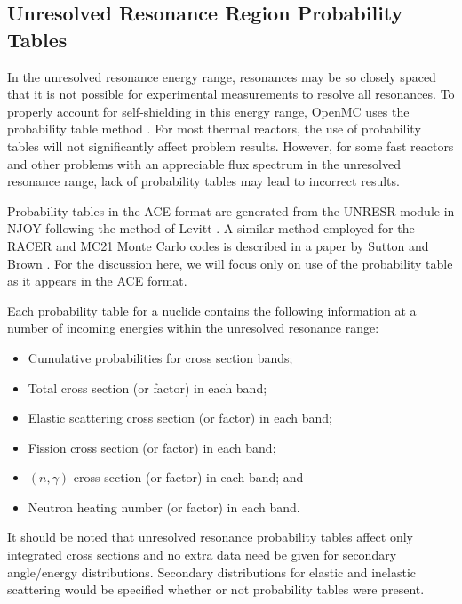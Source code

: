 \subsection{Unresolved Resonance Region Probability Tables}

In the unresolved resonance energy range, resonances may be so closely spaced
that it is not possible for experimental measurements to resolve all
resonances. To properly account for self-shielding in this energy range, OpenMC
uses the probability table method \cite{nse-levitt-1972}. For most thermal
reactors, the use of probability tables will not significantly affect problem
results. However, for some fast reactors and other problems with an appreciable
flux spectrum in the unresolved resonance range, lack of probability tables may
lead to incorrect results.

Probability tables in the ACE format are generated from the UNRESR module in
NJOY \cite{lanl-macfarlane-1994} following the method of Levitt
\cite{nse-levitt-1972}. A similar method employed for the RACER and MC21 Monte
Carlo codes is described in a paper by Sutton and Brown
\cite{physor-sutton-1998}. For the discussion here, we will focus only on use of
the probability table as it appears in the ACE format.

Each probability table for a nuclide contains the following information at a
number of incoming energies within the unresolved resonance range:
\begin{itemize}
\item Cumulative probabilities for cross section bands;
\item Total cross section (or factor) in each band;
\item Elastic scattering cross section (or factor) in each band;
\item Fission cross section (or factor) in each band;
\item $(n,\gamma)$ cross section (or factor) in each band; and
\item Neutron heating number (or factor) in each band.
\end{itemize}
It should be noted that unresolved resonance probability tables affect only
integrated cross sections and no extra data need be given for secondary
angle/energy distributions. Secondary distributions for elastic and inelastic
scattering would be specified whether or not probability tables were present.

